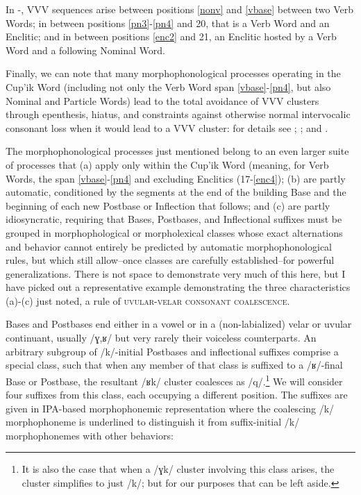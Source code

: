 \documentclass[output=paper]{langscibook}
\begin{document}
In -, VVV sequences arise between positions \ref{nonv} and \ref{vbase} between two Verb Words; in  between positions \ref{pn3}-\ref{pn4} and 20, that is a Verb Word and an Enclitic; and in  between positions \ref{enc2} and 21, an Enclitic hosted by a Verb Word and a following Nominal Word.

Finally, we can note that many morphophonological processes operating in the Cup'ik Word (including not only the Verb Word span \ref{vbase}-\ref{pn4}, but also Nominal and Particle Words) lead to the total avoidance of VVV clusters through epenthesis, hiatus, and constraints against otherwise normal intervocalic consonant loss when it would lead to a VVV cluster: for details see \citealt[29--103]{Woodbury1981}; \citealt[18--38]{Reed1977}; and \citealt[195--219]{Miyaoka2012}.

 \label{sec:5.7.4}

The morphophonological processes just mentioned belong to an even larger suite of processes that (a) apply only within the Cup'ik Word (meaning, for Verb Words, the span \ref{vbase}-\ref{pn4} and excluding Enclitics (17-\ref{enc4}); (b) are partly automatic, conditioned by the segments at the end of the building Base and the beginning of each new Postbase or Inflection that follows; and (c) are partly idiosyncratic, requiring that Bases, Postbases, and Inflectional suffixes must be grouped in morphophological or morpholexical classes whose exact alternations and behavior cannot entirely be predicted by automatic morphophonological rules, but which still allow--once classes are carefully established--for powerful generalizations. There is not space to demonstrate very much of this here, but I have picked out a representative example demonstrating the three characteristics (a)-(c) just noted, a rule of \textsc{uvular-velar} \textsc{consonant} \textsc{coalescence}.

Bases and Postbases end either in a vowel or in a (non-labialized) velar or uvular continuant, usually /ɣ,ʁ/ but very rarely their voiceless counterparts. An arbitrary subgroup of /k/-initial Postbases and inflectional suffixes comprise a special class, such that when any member of that class is suffixed to a /ʁ/-final Base or Postbase, the resultant /ʁk/ cluster coalesces as /q/.\footnote{It is also the case that when a /ɣk/ cluster involving this class arises, the cluster simplifies to just /k/; but for our purposes that can be left aside.} We will consider four suffixes from this class, each occupying a different position. The suffixes are given in IPA-based morphophonemic representation where the coalescing /k/ morphophoneme is underlined to distinguish it from suffix-initial /k/ morphophonemes with other behaviors:
\end{document}
